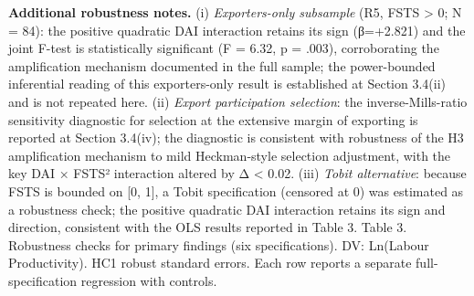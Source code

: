 \documentclass[
  12pt,a4paper]{article}
\begin{document}
\textbf{Additional robustness notes.} (i) \emph{Exporters-only
subsample} (R5, FSTS \textgreater{} 0; N = 84): the positive quadratic
DAI interaction retains its sign (β=+2.821) and the joint F-test is
statistically significant (F = 6.32, p = .003), corroborating the
amplification mechanism documented in the full sample; the power-bounded
inferential reading of this exporters-only result is established at
Section 3.4(ii) and is not repeated here. (ii) \emph{Export
participation selection}: the inverse-Mills-ratio sensitivity diagnostic
for selection at the extensive margin of exporting is reported at
Section 3.4(iv); the diagnostic is consistent with robustness of the H3
amplification mechanism to mild Heckman-style selection adjustment, with
the key DAI × FSTS² interaction altered by \textbar Δ\textbar{}
\textless{} 0.02. (iii) \emph{Tobit alternative}: because FSTS is
bounded on {[}0, 1{]}, a Tobit specification (censored at 0) was
estimated as a robustness check; the positive quadratic DAI interaction
retains its sign and direction, consistent with the OLS results reported
in Table 3. Table 3. Robustness checks for primary findings (six
specifications). DV: Ln(Labour Productivity). HC1 robust standard
errors. Each row reports a separate full-specification regression with
controls.
\end{document}
